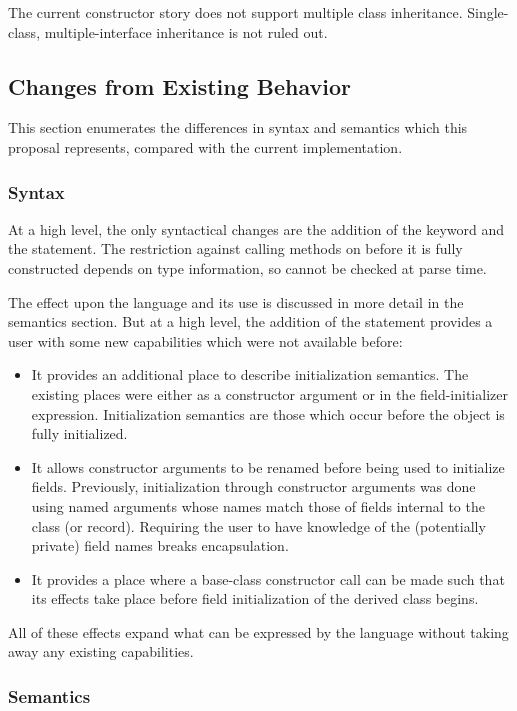 The current constructor story does not support multiple class inheritance.
Single-class, multiple-interface inheritance is not ruled out.

\subsection{Changes from Existing Behavior}

This section enumerates the differences in syntax and semantics which this
proposal represents, compared with the current implementation.

\subsubsection{Syntax}

At a high level, the only syntactical changes are the addition of
the  keyword and the  statement.
The restriction against calling methods
on  before it is fully constructed depends on type information, so
cannot be checked at parse time.

The effect upon the language and its use is discussed in more detail in the
semantics section.  But at a high level, the addition of
the  statement provides a user with some new capabilities
which were not available before:
\begin{itemize}
\item It provides an additional place to describe initialization semantics.  The
existing places were either as a constructor argument or in the
field-initializer expression.  Initialization semantics are those which occur
before the object is fully initialized.
\item It allows constructor arguments to be renamed before being used to
initialize fields.  Previously, initialization
through constructor arguments was done using named arguments whose names match
those of fields internal to the class (or record).  Requiring the user to have
knowledge of the (potentially private) field names breaks encapsulation.
\item It provides a place where a base-class constructor call can be made such
that its effects take place before field initialization of the derived class begins.
\end{itemize}
All of these effects expand what can be expressed by the language without taking
away any existing capabilities.

\subsubsection{Semantics}

